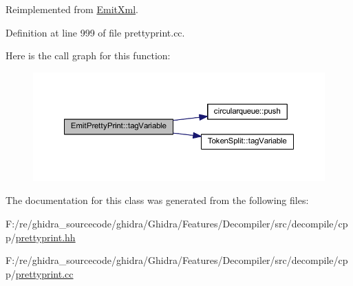 Reimplemented from \mbox{\hyperlink{class_emit_xml_aeac0d9e1327c3aa1bd2e3fe42e3a1824}{Emit\+Xml}}.



Definition at line 999 of file prettyprint.\+cc.

Here is the call graph for this function\+:
\nopagebreak
\begin{figure}[H]
\begin{center}
\leavevmode
\includegraphics[width=350pt]{class_emit_pretty_print_a2011607fe7e41704351bb7d653f9e205_cgraph}
\end{center}
\end{figure}


The documentation for this class was generated from the following files\+:\begin{DoxyCompactItemize}
\item 
F\+:/re/ghidra\+\_\+sourcecode/ghidra/\+Ghidra/\+Features/\+Decompiler/src/decompile/cpp/\mbox{\hyperlink{prettyprint_8hh}{prettyprint.\+hh}}\item 
F\+:/re/ghidra\+\_\+sourcecode/ghidra/\+Ghidra/\+Features/\+Decompiler/src/decompile/cpp/\mbox{\hyperlink{prettyprint_8cc}{prettyprint.\+cc}}\end{DoxyCompactItemize}
